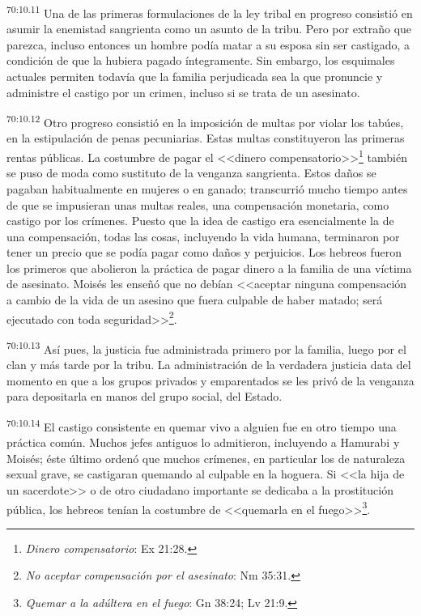 \par
\textsuperscript{70:10.11} Una de las primeras formulaciones de la ley tribal en progreso consistió en asumir la enemistad sangrienta como un asunto de la tribu. Pero por extraño que parezca, incluso entonces un hombre podía matar a su esposa sin ser castigado, a condición de que la hubiera pagado íntegramente. Sin embargo, los esquimales actuales permiten todavía que la familia perjudicada sea la que pronuncie y administre el castigo por un crimen, incluso si se trata de un asesinato.

\par
\textsuperscript{70:10.12} Otro progreso consistió en la imposición de multas por violar los tabúes, en la estipulación de penas pecuniarias. Estas multas constituyeron las primeras rentas públicas. La costumbre de pagar el <<dinero compensatorio>>\footnote{\textit{Dinero compensatorio}: Ex 21:28.} también se puso de moda como sustituto de la venganza sangrienta. Estos daños se pagaban habitualmente en mujeres o en ganado; transcurrió mucho tiempo antes de que se impusieran unas multas reales, una compensación monetaria, como castigo por los crímenes. Puesto que la idea de castigo era esencialmente la de una compensación, todas las cosas, incluyendo la vida humana, terminaron por tener un precio que se podía pagar como daños y perjuicios. Los hebreos fueron los primeros que abolieron la práctica de pagar dinero a la familia de una víctima de asesinato. Moisés les enseñó que no debían <<aceptar ninguna compensación a cambio de la vida de un asesino que fuera culpable de haber matado; será ejecutado con toda seguridad>>\footnote{\textit{No aceptar compensación por el asesinato}: Nm 35:31.}.

\par
\textsuperscript{70:10.13} Así pues, la justicia fue administrada primero por la familia, luego por el clan y más tarde por la tribu. La administración de la verdadera justicia data del momento en que a los grupos privados y emparentados se les privó de la venganza para depositarla en manos del grupo social, del Estado.

\par
\textsuperscript{70:10.14} El castigo consistente en quemar vivo a alguien fue en otro tiempo una práctica común. Muchos jefes antiguos lo admitieron, incluyendo a Hamurabi y Moisés; éste último ordenó que muchos crímenes, en particular los de naturaleza sexual grave, se castigaran quemando al culpable en la hoguera. Si <<la hija de un sacerdote>> o de otro ciudadano importante se dedicaba a la prostitución pública, los hebreos tenían la costumbre de <<quemarla en el fuego>>\footnote{\textit{Quemar a la adúltera en el fuego}: Gn 38:24; Lv 21:9.}.

